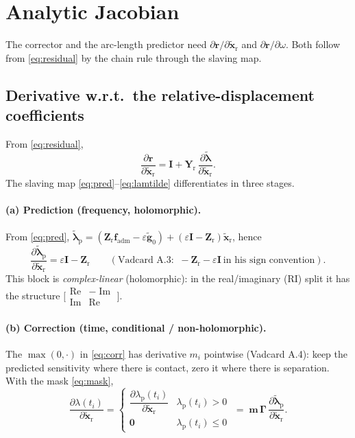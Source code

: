 \documentclass[11pt]{article}
\newcommand{\Ib}{\bm{I}}
\newcommand{\Gam}{\bm{\Gamma}}
\newcommand{\fadm}{\bm{f}_{\!\mathrm{adm}}}
\newcommand{\xr}{\tilde{\bm{x}}_{\mathrm r}}      %
\newcommand{\lamt}{\tilde{\bm{\lambda}}}          %
\newcommand{\Yr}{\bm{Y}_{\mathrm r}}
\newcommand{\Zr}{\bm{Z}_{\mathrm r}}
\newcommand{\Real}{\operatorname{Re}}
\newcommand{\Imag}{\operatorname{Im}}
\begin{document}
\section{Analytic Jacobian}
\label{sec:jac}
The corrector and the arc-length predictor need
$\partial\bm r/\partial\xr$ and $\partial\bm r/\partial\omega$. Both follow
from \eqref{eq:residual} by the chain rule through the slaving map.

\subsection{Derivative w.r.t.\ the relative-displacement coefficients}
From \eqref{eq:residual},
\begin{equation}
\frac{\partial\bm r}{\partial\xr}
=\Ib+\Yr\,\frac{\partial\lamt}{\partial\xr}.
\label{eq:drdx}
\end{equation}
The slaving map \eqref{eq:pred}--\eqref{eq:lamtilde} differentiates in
three stages.

\paragraph{(a) Prediction (frequency, holomorphic).} From \eqref{eq:pred},
$\lamt_{\mathrm p}=(\Zr\fadm-\varepsilon\tilde{\bm g}_0)+(\varepsilon\Ib-\Zr)\xr$, hence
\begin{equation}
\frac{\partial\lamt_{\mathrm p}}{\partial\xr}=\varepsilon\Ib-\Zr
\qquad(\text{Vadcard A.3: }\ -\Zr-\varepsilon\Ib\ \text{in his sign convention}).
\label{eq:dpred}
\end{equation}
This block is \emph{complex-linear} (holomorphic): in the real/imaginary
(RI) split it has the structure $\bigl[\begin{smallmatrix}\Real&-\Imag\\\Imag&\Real\end{smallmatrix}\bigr]$.

\paragraph{(b) Correction (time, conditional / non-holomorphic).} The
$\max(0,\cdot)$ in \eqref{eq:corr} has derivative $m_i$ pointwise
(Vadcard A.4): keep the predicted sensitivity where there is contact, zero
it where there is separation. With the mask \eqref{eq:mask},
\begin{equation}
\frac{\partial\lambda(t_i)}{\partial\xr}
=\begin{cases}\dfrac{\partial\lambda_{\mathrm p}(t_i)}{\partial\xr}&\lambda_{\mathrm p}(t_i)>0\\[6pt]
\bm 0&\lambda_{\mathrm p}(t_i)\le0\end{cases}
\;=\;\bm m\,\Gam\,\frac{\partial\lamt_{\mathrm p}}{\partial\xr}.
\label{eq:dcorr}
\end{equation}
\end{document}
